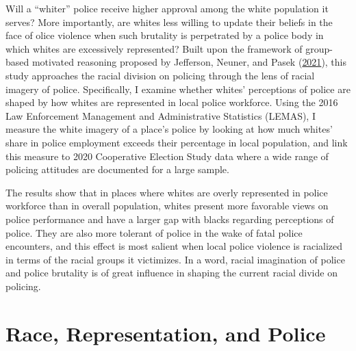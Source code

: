 \documentclass[
  12pt,
]{article}
\begin{document}
Will a ``whiter'' police receive higher approval among the white
population it serves? More importantly, are whites less willing to
update their beliefs in the face of olice violence when such brutality
is perpetrated by a police body in which whites are excessively
represented? Built upon the framework of group-based motivated reasoning
proposed by Jefferson, Neuner, and Pasek
(\protect\hyperlink{ref-jefferson2021}{2021}), this study approaches the
racial division on policing through the lens of racial imagery of
police. Specifically, I examine whether whites' perceptions of police
are shaped by how whites are represented in local police workforce.
Using the 2016 Law Enforcement Management and Administrative Statistics
(LEMAS), I measure the white imagery of a place's police by looking at
how much whites' share in police employment exceeds their percentage in
local population, and link this measure to 2020 Cooperative Election
Study data where a wide range of policing attitudes are documented for a
large sample.

The results show that in places where whites are overly represented in
police workforce than in overall population, whites present more
favorable views on police performance and have a larger gap with blacks
regarding perceptions of police. They are also more tolerant of police
in the wake of fatal police encounters, and this effect is most salient
when local police violence is racialized in terms of the racial groups
it victimizes. In a word, racial imagination of police and police
brutality is of great influence in shaping the current racial divide on
policing.

\hypertarget{race-representation-and-police}{%
\section{Race, Representation, and
Police}\label{race-representation-and-police}}
\end{document}
